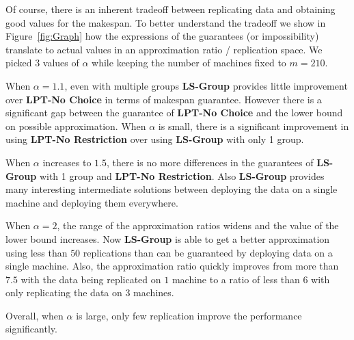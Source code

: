 \documentclass[twocolumn]{svjour3}
\begin{document}
Of course, there is an inherent tradeoff between replicating data and
obtaining good values for the makespan. To better understand the
tradeoff we show in Figure~\ref{fig:Graph} how the expressions of the
guarantees (or impossibility) translate to actual values in an
approximation ratio / replication space.  We picked 3 values of
$\alpha$ while keeping the number of machines fixed to $m=210$. 

When $\alpha=1.1$, even with multiple groups {\bf LS-Group} provides little
improvement over {\bf LPT-No Choice} in terms of makespan guarantee. However there is a significant
gap between the guarantee of {\bf LPT-No Choice} and the lower bound
on possible approximation. When $\alpha$ is small, there is a
significant improvement in using {\bf LPT-No Restriction} over using
 {\bf LS-Group} with only 1 group.

When $\alpha$ increases to $1.5$, there is no more differences in the
guarantees of {\bf LS-Group} with 1 group and {\bf LPT-No
  Restriction}. Also {\bf LS-Group} provides many interesting intermediate
solutions between deploying the data on a single machine and deploying
them everywhere.

When $\alpha=2$, the range of the approximation ratios widens and
the value of the lower bound increases. Now {\bf LS-Group} is able to
get a better approximation using less than $50$ replications than 
can be guaranteed by deploying data on a single machine. Also, the
approximation ratio quickly improves from more than $7.5$ with the
data being replicated on $1$ machine to a ratio of less than $6$ with
only replicating the data on $3$ machines.

Overall, when $\alpha$ is large, only few replication improve the
performance significantly.
\end{document}
